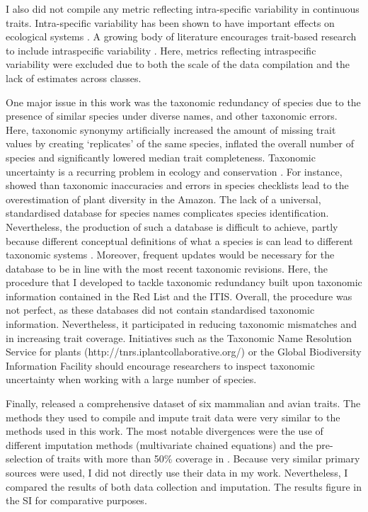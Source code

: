 I also did not compile any metric reflecting intra-specific variability in continuous traits. Intra-specific variability has been shown to have important effects on ecological systems \citep{DesRoches2018, Bolnick2011, Gonzalez-Suarez2013a}. A growing body of literature encourages trait-based research to include intraspecific variability \citep{Carmona2016, Violle2012}. Here, metrics reflecting intraspecific variability were excluded due to both the scale of the data compilation and the lack of estimates across classes.

One major issue in this work was the taxonomic redundancy of species due to the presence of similar species under diverse names, and other taxonomic errors. Here, taxonomic synonymy artificially increased the amount of missing trait values by creating `replicates' of the same species, inflated the overall number of species and significantly lowered median trait completeness. Taxonomic uncertainty is a recurring problem in ecology and conservation \citep{Isaac2004}. For instance, \citet{Cardoso2017} showed than taxonomic inaccuracies and errors in species checklists lead to the overestimation of plant diversity in the Amazon. The lack of a universal, standardised database for species names complicates species identification. Nevertheless, the production of such a database is difficult to achieve, partly because different conceptual definitions of what a species is can lead to different taxonomic systems \citep{Isaac2004}. Moreover, frequent updates would be necessary for the database to be in line with the most recent taxonomic revisions. Here, the procedure that I developed to tackle taxonomic redundancy built upon taxonomic information contained in the Red List and the ITIS. Overall, the procedure was not perfect, as these databases did not contain standardised taxonomic information. Nevertheless, it participated in reducing taxonomic mismatches and in increasing trait coverage. Initiatives such as the Taxonomic Name Resolution Service for plants (http://tnrs.iplantcollaborative.org/) or the Global Biodiversity Information Facility should encourage researchers to inspect taxonomic uncertainty when working with a large number of species.

Finally, \citet{Cooke2019} released a comprehensive dataset of six mammalian and avian traits. The methods they used to compile and impute trait data were very similar to the methods used in this work. The most notable divergences were the use of different imputation methods (multivariate chained equations) and the pre-selection of traits with more than 50\% coverage in \citet{Cooke2019}. Because very similar primary sources were used, I did not directly use their data in my work. Nevertheless, I compared the results of both data collection and imputation. The results figure in the SI for comparative purposes.
 

